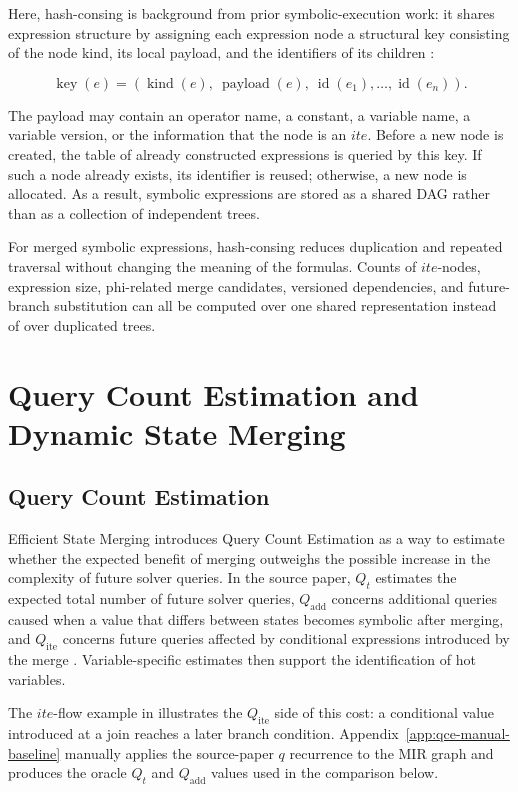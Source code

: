 \documentclass[conference]{IEEEtran}
\newcommand{\ite}{\mathit{ite}}
\begin{document}
Here, hash-consing is background from prior symbolic-execution work: it shares
expression structure by assigning each expression node a structural key
consisting of the node kind, its local payload, and the identifiers of its
children \cite{veritesting}:

\[
\operatorname{key}(e) =
(\operatorname{kind}(e),\ \operatorname{payload}(e),\ \operatorname{id}(e_1),\ldots,\operatorname{id}(e_n)).
\]

The payload may contain an operator name, a constant, a variable name, a
variable version, or the information that the node is an \(\ite\). Before a new
node is created, the table of already constructed expressions is queried by
this key. If such a node already exists, its identifier is reused; otherwise, a
new node is allocated. As a result, symbolic expressions are stored as a shared
DAG rather than as a collection of independent trees.

For merged symbolic expressions, hash-consing reduces duplication and repeated
traversal without changing the meaning of the formulas. Counts of
\(\ite\)-nodes, expression size, phi-related merge candidates, versioned
dependencies, and future-branch substitution can all be computed over one
shared representation instead of over duplicated trees.

\section{Query Count Estimation and Dynamic State Merging}
\label{sec:qce}

\subsection{Query Count Estimation}
\label{sec:qce-theory}

Efficient State Merging introduces Query Count Estimation as a way to estimate
whether the expected benefit of merging outweighs the possible increase in the
complexity of future solver queries. In the source paper, \(Q_t\) estimates
the expected total number of future solver queries, \(Q_{\mathrm{add}}\)
concerns additional queries caused when a value that differs between states
becomes symbolic after merging, and \(Q_{\mathrm{ite}}\) concerns future
queries affected by conditional expressions introduced by the merge
\cite{efficient-merging}. Variable-specific estimates then support the
identification of hot variables.

The \(\ite\)-flow example in  illustrates the
\(Q_{\mathrm{ite}}\) side of this cost: a conditional value introduced at a
join reaches a later branch condition. Appendix~\ref{app:qce-manual-baseline}
manually applies the source-paper \(q\) recurrence to the MIR graph and
produces the oracle \(Q_t\) and \(Q_{\mathrm{add}}\) values used in the
comparison below.
\end{document}
